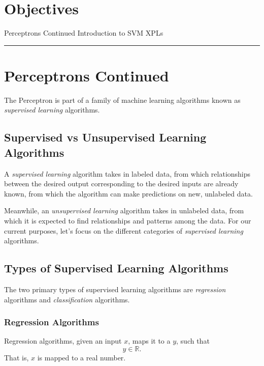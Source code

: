 \section*{Objectives}
\begin{outline}
    \1 Perceptrons Continued
    \1 Introduction to SVM
    \1 XPLs
\end{outline}

\rule[0.0051in]{\textwidth}{0.00025in}

\section{Perceptrons Continued}
The Perceptron\cite{rosenblatt1958perceptron} is part of a family of machine learning algorithms known as \textit{supervised learning} algorithms.

\subsection{Supervised vs Unsupervised Learning Algorithms}
A \textit{supervised learning} algorithm takes in labeled data, from which relationships between the desired output corresponding to the desired inputs are already known, from which the algorithm can make predictions on new, unlabeled data.

Meanwhile, an \textit{unsupervised learning} algorithm takes in unlabeled data, from which it is expected to find relationships and patterns among the data. For our current purposes, let's focus on the different categories of \textit{supervised learning} algorithms.

\subsection{Types of Supervised Learning Algorithms}
The two primary types of supervised learning algorithms are \textit{regression} algorithms and \textit {classification} algorithms.

\subsubsection{Regression Algorithms}
Regression algorithms, given an input $x$, maps it to a $y$, such that
\[
    y \in \mathbb{R}.
\]
That is, $x$ is mapped to a real number.

